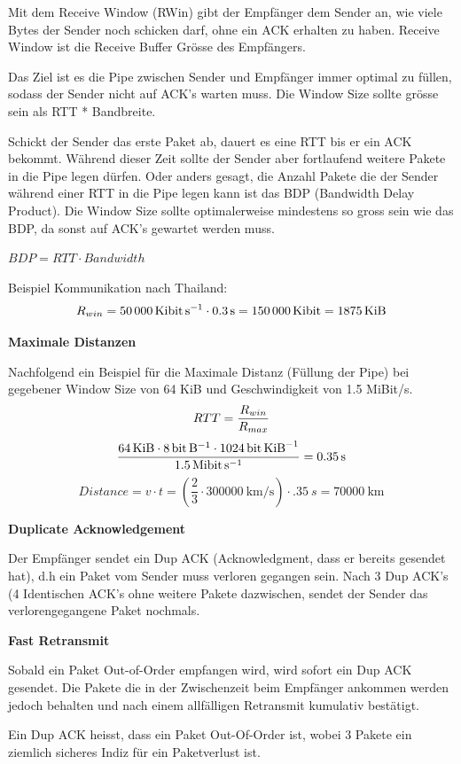 Mit dem Receive Window (RWin) gibt der Empfänger dem Sender an, wie viele Bytes
der Sender noch schicken darf, ohne ein ACK erhalten zu haben. Receive Window
ist die Receive Buffer Grösse des Empfängers.

Das Ziel ist es die Pipe zwischen Sender und Empfänger immer optimal zu füllen,
sodass der Sender nicht auf ACK's warten muss. Die Window Size sollte grösse
sein als RTT * Bandbreite.

Schickt der Sender das erste Paket ab, dauert es eine RTT bis er ein ACK
bekommt. Während dieser Zeit sollte der Sender aber fortlaufend weitere Pakete
in die Pipe legen dürfen. Oder anders gesagt, die Anzahl Pakete die der Sender
während einer RTT in die Pipe legen kann ist das BDP (Bandwidth Delay Product).
Die Window Size sollte optimalerweise mindestens so gross sein wie das BDP, da
sonst auf ACK's gewartet werden muss.

$BDP=RTT \cdot Bandwidth$

Beispiel Kommunikation nach Thailand:
\[
	R_{win} = \SI{50000}{\kibi\bit\per\second} \cdot \SI{.3}{\second} = \SI{150000}{\kibi\bit} = \SI{1875}{\kibi\byte}
\]

\textbf{Maximale Distanzen}

Nachfolgend ein Beispiel für die Maximale Distanz (Füllung der Pipe) bei
gegebener Window Size von 64 KiB und Geschwindigkeit von 1.5 MiBit/s.
\[
	RTT = \frac{R_{win}}{R_{max}}\\
\]
\[
	\frac{\SI{64}{\kibi\byte} \cdot \SI{8}{\bit\per\byte} \cdot
	\SI{1024}{\bit\per\kibi\byte}}{\SI{1.5}{\mebi\bit\per\second}} = \SI{.35}{s}
\]
\[
	Distance = v \cdot t =\left(\frac{2}{3} \cdot \SI{300000}{\kilo\meter\per\second}\right)\cdot \SI{.35}{s} = \SI{70000}{\kilo\meter}
\]

\textbf{Duplicate Acknowledgement}

Der Empfänger sendet ein Dup ACK (Acknowledgment, dass er bereits gesendet hat),
d.h ein Paket vom Sender muss verloren gegangen sein. Nach 3 Dup ACK's (4
Identischen ACK's ohne weitere Pakete dazwischen, sendet der Sender das
verlorengegangene Paket nochmals.

\textbf{Fast Retransmit}

Sobald ein Paket Out-of-Order empfangen wird, wird sofort ein Dup ACK gesendet.
Die Pakete die in der Zwischenzeit beim Empfänger ankommen werden jedoch
behalten und nach einem allfälligen Retransmit kumulativ bestätigt.

Ein Dup ACK heisst, dass ein Paket Out-Of-Order ist, wobei 3 Pakete ein ziemlich
sicheres Indiz für ein Paketverlust ist.

